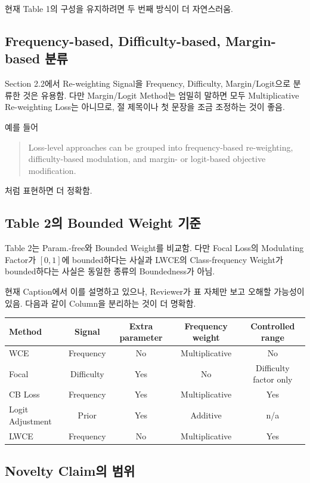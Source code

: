 \documentclass[11pt,a4paper]{article}
\begin{document}
현재 Table 1의 구성을 유지하려면 두 번째 방식이 더 자연스러움.

\subsection{Frequency-based, Difficulty-based, Margin-based 분류}

Section 2.2에서 Re-weighting Signal을 Frequency, Difficulty, Margin/Logit으로 분류한 것은 유용함. 다만 Margin/Logit Method는 엄밀히 말하면 모두 Multiplicative Re-weighting Loss는 아니므로, 절 제목이나 첫 문장을 조금 조정하는 것이 좋음.

예를 들어

\begin{quote}
Loss-level approaches can be grouped into frequency-based re-weighting, difficulty-based modulation, and margin- or logit-based objective modification.
\end{quote}

처럼 표현하면 더 정확함.

\subsection{Table 2의 Bounded Weight 기준}

Table 2는 Param.-free와 Bounded Weight를 비교함. 다만 Focal Loss의 Modulating Factor가 \([0,1]\)에 bounded하다는 사실과 LWCE의 Class-frequency Weight가 bounded하다는 사실은 동일한 종류의 Boundedness가 아님.

현재 Caption에서 이를 설명하고 있으나, Reviewer가 표 자체만 보고 오해할 가능성이 있음. 다음과 같이 Column을 분리하는 것이 더 명확함.

\begin{center}
\begin{tabular}{lcccc}
\toprule
Method & Signal & Extra parameter & Frequency weight & Controlled range \\
\midrule
WCE & Frequency & No & Multiplicative & No \\
Focal & Difficulty & Yes & No & Difficulty factor only \\
CB Loss & Frequency & Yes & Multiplicative & Yes \\
Logit Adjustment & Prior & Yes & Additive & n/a \\
LWCE & Frequency & No & Multiplicative & Yes \\
\bottomrule
\end{tabular}
\end{center}

\subsection{Novelty Claim의 범위}
\end{document}
